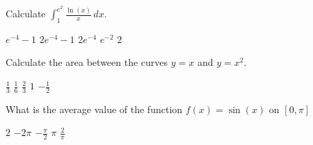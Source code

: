 \documentclass[11pt]{article}
\begin{document}
\begin{questions}
\begin{multiplechoice}{5}
\question Calculate $\int_1^{e^2} \frac{\ln(x)}{x} \, dx$.
\begin{answers}{2}
\ans $e^{-4} - 1$ 
\ans $2e^{-4} - 1$
\ans $2e^{-4}$
\ans $e^{-2}$
\ans $2$
\end{answers}

\question Calculate the area between the curves $y = x$ and $y = x^2$.
\begin{answers}{3}
\ans $\frac 1 3$ 
\ans $\frac 1 6$ 
\ans $\frac 2 3$ 
\ans $1$ 
\ans $- \frac 1 2$ 
\end{answers}

\question What is the average value of the function $f(x) = \sin(x)$ on $[0, \pi]$
\begin{answers}{3}
\ans $2$
\ans $-2\pi$
\ans $-\frac{\pi}{2}$
\ans $\pi$
\ans $\frac{2}{\pi}$
\end{answers}

\end{multiplechoice}
\end{questions}
\end{document}
